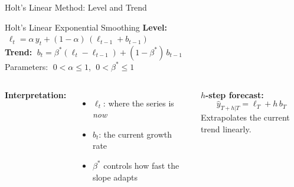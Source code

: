\documentclass[aspectratio=169, 11pt]{beamer}
\begin{document}
\begin{frame}{Holt's Linear Method: Level and Trend}
  \begin{definitionbox}{Holt's Linear Exponential Smoothing}
    {\small
    \textbf{Level:}
    $\;\ell_t = \alpha\, y_t + (1-\alpha)\,(\ell_{t-1} + b_{t-1})$\\[4pt]
    \textbf{Trend:}
    $\;b_t = \beta^*(\ell_t - \ell_{t-1}) + (1-\beta^*)\,b_{t-1}$\\[4pt]
    Parameters: $\;0 < \alpha \leq 1$, $\;0 < \beta^* \leq 1$
    \hfill{}
    }
  \end{definitionbox}
  \vspace{0.1cm}
  \begin{columns}[T]
      \textbf{Interpretation:}
      \begin{itemize}
        \item $\ell_t$: where the series is \emph{now}
        \item $b_t$: the current growth rate
        \item $\beta^*$ controls how fast the slope adapts
      \end{itemize}
      \textbf{$h$-step forecast:}
      \[
        \hat{y}_{T+h|T} = \ell_T + h\,b_T
      \]
      Extrapolates the current trend linearly.
  \end{columns}
\end{frame}
\end{document}
